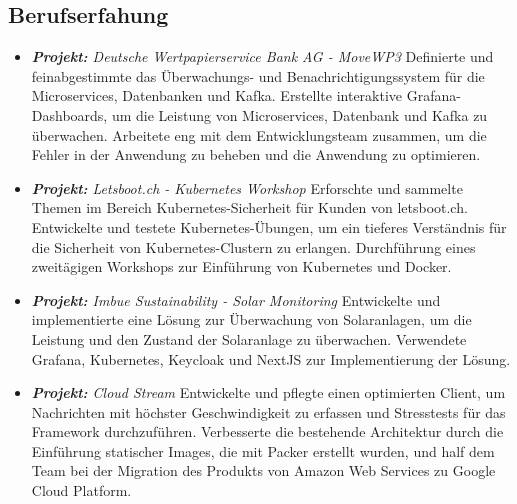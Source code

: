 \documentclass[../main.tex]{subfiles}
\begin{document}
  \begin{category}
    \section{Berufserfahung}

      \begin{itemize}
        \item \emph{\textbf{Projekt:} Deutsche Wertpapierservice Bank AG - MoveWP3}
        Definierte und feinabgestimmte das Überwachungs- und Benachrichtigungssystem für die Microservices, Datenbanken und Kafka.
        Erstellte interaktive Grafana-Dashboards, um die Leistung von Microservices, Datenbank und Kafka zu überwachen.
        Arbeitete eng mit dem Entwicklungsteam zusammen, um die Fehler in der Anwendung zu beheben und die Anwendung zu optimieren.
      \end{itemize}

      \begin{itemize}
        \item \emph{\textbf{Projekt:} Letsboot.ch - Kubernetes Workshop}
        Erforschte und sammelte Themen im Bereich Kubernetes-Sicherheit für Kunden von letsboot.ch.
        Entwickelte und testete Kubernetes-Übungen, um ein tieferes Verständnis für die Sicherheit 
        von Kubernetes-Clustern zu erlangen.
        Durchführung eines zweitägigen Workshops zur Einführung von Kubernetes und Docker.
      \end{itemize}

      \begin{itemize}
        \item \emph{\textbf{Projekt:} Imbue Sustainability - Solar Monitoring}
        Entwickelte und implementierte eine Lösung zur Überwachung von Solaranlagen, 
        um die Leistung und den Zustand der Solaranlage zu überwachen. 
        Verwendete Grafana, Kubernetes, Keycloak und NextJS zur Implementierung der Lösung.
      \end{itemize}

      \begin{itemize}
        \item \emph{\textbf{Projekt:} Cloud Stream}
        Entwickelte und pflegte einen optimierten Client, um Nachrichten mit 
        höchster Geschwindigkeit zu erfassen und Stresstests für das 
        Framework durchzuführen. Verbesserte die bestehende Architektur 
        durch die Einführung statischer Images, die mit Packer erstellt 
        wurden, und half dem Team bei der Migration des Produkts von
        Amazon Web Services zu Google Cloud Platform.
      \end{itemize}


\end{category}
\end{document}
